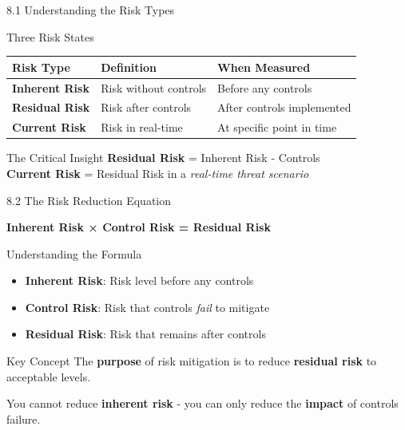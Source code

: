 \documentclass{beamer}
\begin{document}
	\begin{frame}{8.1 Understanding the Risk Types}
		\begin{block}{Three Risk States}
			\begin{tabular}{|p{2.5cm}|p{4cm}|p{4.5cm}|}
				\hline
				\textbf{Risk Type} & \textbf{Definition} & \textbf{When Measured} \\
				\hline
				\textbf{Inherent Risk} & Risk without controls & Before any controls \\
				\hline
				\textbf{Residual Risk} & Risk after controls & After controls implemented \\
				\hline
				\textbf{Current Risk} & Risk in real-time & At specific point in time \\
				\hline
			\end{tabular}
		\end{block}
		
		\begin{alertblock}{The Critical Insight}
			\textbf{Residual Risk} = Inherent Risk - Controls \\
			\textbf{Current Risk} = Residual Risk in a \textit{real-time threat scenario}
		\end{alertblock}
	\end{frame}
	
	\begin{frame}{8.2 The Risk Reduction Equation}
		\begin{center}
			\Large{\textbf{Inherent Risk × Control Risk = Residual Risk}}
		\end{center}
		
		\begin{block}{Understanding the Formula}
			\begin{itemize}
				\item \textbf{Inherent Risk}: Risk level before any controls
				\item \textbf{Control Risk}: Risk that controls \textit{fail} to mitigate
				\item \textbf{Residual Risk}: Risk that remains after controls
			\end{itemize}
		\end{block}
		
		\begin{exampleblock}{Key Concept}
			The \textbf{purpose} of risk mitigation is to reduce \textbf{residual risk} to acceptable levels.
			
			You cannot reduce \textbf{inherent risk} - you can only reduce the \textbf{impact} of controls failure.
		\end{exampleblock}
	\end{frame}
	
\end{document}
